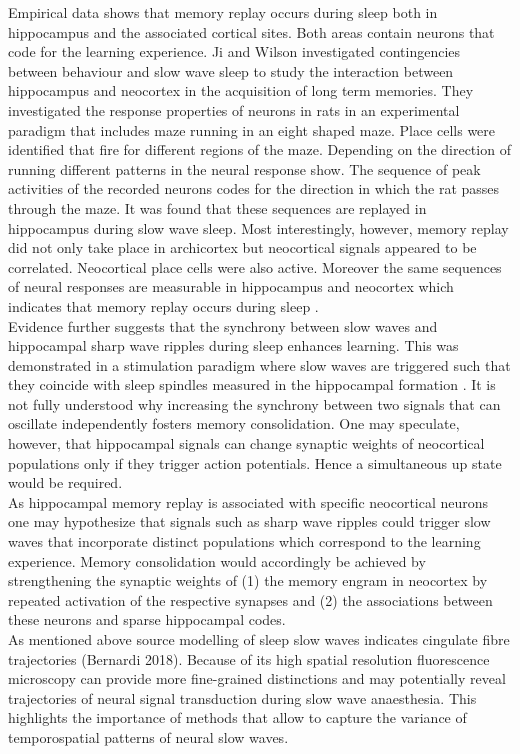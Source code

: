 Empirical data shows that memory replay occurs during sleep both in hippocampus and the associated cortical sites. Both areas contain neurons that code for the learning experience. Ji and Wilson \parencite*{ji2007coordinated} investigated contingencies between behaviour and slow wave sleep to study the interaction between hippocampus and neocortex in the acquisition of long term memories. They investigated the response properties of neurons in rats in an experimental paradigm that includes maze running in an eight shaped maze. Place cells were identified that fire for different regions of the maze. Depending on the direction of running different patterns in the neural response show. The sequence of peak activities of the recorded neurons codes for the direction in which the rat passes through the maze. It was found that these sequences are replayed in hippocampus during slow wave sleep. Most interestingly, however, memory replay did not only take place in archicortex but neocortical signals appeared to be correlated. Neocortical place cells were also active. Moreover the same sequences of neural responses are measurable in hippocampus and neocortex which indicates that memory replay occurs during sleep \parencite{ji2007coordinated}.\\
Evidence further suggests that the synchrony between slow waves and hippocampal sharp wave ripples during sleep enhances learning. This was demonstrated in a stimulation paradigm where slow waves are triggered such that they coincide with sleep spindles measured in the hippocampal formation \parencite{maingret2016hippocampo}. It is not fully understood why increasing the synchrony between two signals that can oscillate independently fosters memory consolidation. One may speculate, however, that hippocampal signals can change synaptic weights of neocortical populations only if they trigger action potentials. Hence a simultaneous up state would be required.\\
As hippocampal memory replay is associated with specific neocortical neurons one may hypothesize that signals such as sharp wave ripples could trigger slow waves that incorporate distinct populations which correspond to the learning experience. Memory consolidation would accordingly be achieved by strengthening the synaptic weights of (1) the memory engram in neocortex by repeated activation of the respective synapses and (2) the associations between these neurons and sparse hippocampal codes.\\
 As mentioned above source modelling of sleep slow waves indicates cingulate fibre trajectories (Bernardi 2018). Because of its high spatial resolution fluorescence microscopy can provide more fine-grained distinctions and may potentially reveal trajectories of neural signal transduction during slow wave anaesthesia. This highlights the importance of methods that allow to capture the variance of temporospatial patterns of neural slow waves.\\
